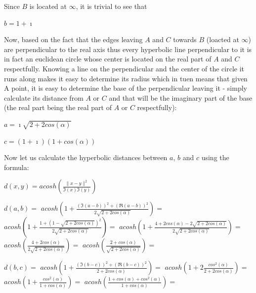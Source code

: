 \documentclass[a4paper,10pt]{article}
\begin{document}
Since $B$ is located at $\infty$, it is trivial to see that

$b = 1 + \mathbf{\imath}$

Now, based on the fact that the edges leaving $A$ and $C$ towards $B$ (loacted at $\infty$) are perpendicular to the real axis
thus every hyperbolic line perpendicular to it is in fact an euclidean circle whose center is located on the real part of $A$ and $C$ respectfully. 
Knowing a line on the perpendicular and the center of the circle it runs along makes it easy to determine its radius which in tuen means that given
A point, it is easy to determine the base of the perpendicular leaving it - simply calculate its distance from $A$ or $C$ and that will be the imaginary
part of the base (the real part being the real part of $A$ or $C$ respectfully):

$a = \mathbf{\imath} \sqrt{2 + 2 cos\left(\alpha\right)}$

$c = \left(1 + \mathbf{\imath}\right) \left(1 + cos\left(\alpha\right)\right)$


Now let us calculate the hyperbolic distances between $a$, $b$ and $c$ using the formula:

$d\left(x,y\right) = acosh(\frac{\|x-y\|^{2}}{\Im\left(x\right)\Im\left(y\right)})$

$d\left(a, b\right) =$
$acosh\left(1 + \frac{\left(\Im\left(a - b\right)\right)^{2} + \left(\Re\left(a - b\right)\right)^{2}}{2 \sqrt{2 + 2 cos\left(\alpha\right)}}\right) =$
$acosh\left(1 + \frac{1 + \left(1 - \sqrt{2 + 2 cos\left(\alpha\right)}\right)^{2}}{2 \sqrt{2 + 2 cos\left(\alpha\right)}}\right) =$
$acosh\left(1 + \frac{4 + 2 cos\left(\alpha\right) - 2 \sqrt{2 + 2 cos\left(\alpha\right)}}{2 \sqrt{2 + 2 cos\left(\alpha\right)}}\right) =$
$acosh\left(\frac{4 + 2 cos\left(\alpha\right)}{2 \sqrt{2 + 2 cos\left(\alpha\right)}}\right) =$
$acosh\left(\frac{2 + cos\left(\alpha\right)}{\sqrt{2 + 2 cos\left(\alpha\right)}}\right) =$


$d\left(b, c\right) = $
$acosh\left(1 + \frac{\left(\Im\left(b - c\right)\right)^{2} + \left(\Re\left(b - c\right)\right)^{2}}{2 + 2 cos\left(\alpha\right)}\right) =$
$acosh\left(1 + 2 \frac{cos^{2}\left(\alpha\right)}{2 + 2 cos\left(\alpha\right)}\right) =$
$acosh\left(1 + \frac{cos^{2}\left(\alpha\right)}{1 + cos\left(\alpha\right)}\right) =$
$acosh\left(\frac{1 + cos\left(\alpha\right) + cos^{2}\left(\alpha\right)}{1 + cos\left(\alpha\right)}\right) =$
\end{document}
